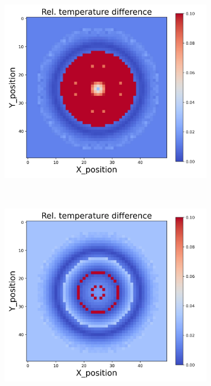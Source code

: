 {\begin{figure}[h]
\begin{minipage}{\textwidth}
\begin{subfigure}{0.28\textwidth}
        \end{subfigure}
        \begin{subfigure}{0.28\textwidth}
            \centering
            \includegraphics[width=\textwidth]{figures/raw_data/24/linear/T_bias.jpg}
        \end{subfigure}
    \end{minipage}\\
    \begin{minipage}{\textwidth}
        \centering
        \begin{subfigure}{0.28\textwidth}
            \centering
            \includegraphics[width=\textwidth]{figures/raw_data/25/linear/T_bias.jpg}

\end{subfigure}
\end{minipage}
\end{figure}}
